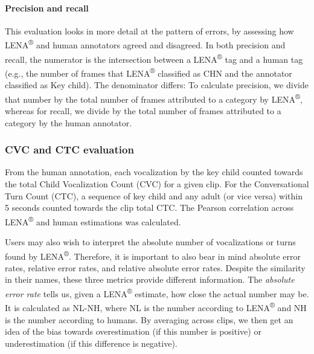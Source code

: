 \documentclass[english,floatsintext,man]{apa6}
\begin{document}
\paragraph{Precision and recall}\label{precision-and-recall}

This evaluation looks in more detail at the pattern of errors, by
assessing how LENA\textsuperscript{®} and human annotators agreed and
disagreed. In both precision and recall, the numerator is the
intersection between a LENA\textsuperscript{®} tag and a human tag
(e.g., the number of frames that LENA\textsuperscript{®} classified as
CHN and the annotator classified as Key child). The denominator differs:
To calculate precision, we divide that number by the total number of
frames attributed to a category by LENA\textsuperscript{®}, whereas for
recall, we divide by the total number of frames attributed to a category
by the human annotator.

\subsubsection{CVC and CTC evaluation}\label{cvc-and-ctc-evaluation}

From the human annotation, each vocalization by the key child counted
towards the total Child Vocalization Count (CVC) for a given clip. For
the Conversational Turn Count (CTC), a sequence of key child and any
adult (or vice versa) within 5 seconds counted towards the clip total
CTC. The Pearson correlation across LENA\textsuperscript{®} and human
estimations was calculated.

Users may also wish to interpret the absolute number of vocalizations or
turns found by LENA\textsuperscript{®}. Therefore, it is important to
also bear in mind absolute error rates, relative error rates, and
relative absolute error rates. Despite the similarity in their names,
these three metrics provide different information. The \emph{absolute
error rate} tells us, given a LENA\textsuperscript{®} estimate, how
close the actual number may be. It is calculated as NL-NH, where NL is
the number according to LENA\textsuperscript{®} and NH is the number
according to humans. By averaging across clips, we then get an idea of
the bias towards overestimation (if this number is positive) or
underestimation (if this difference is negative).
\end{document}

